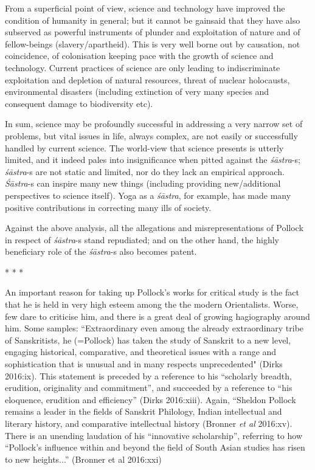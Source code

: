 From a superficial point of view, science and technology have improved the condition of humanity in general; but it cannot be gainsaid that they have also subserved as powerful instruments of plunder and exploitation of nature and of fellow-beings (slavery/apartheid). This is very well borne out by causation, not coincidence, of colonisation keeping pace with the growth of science and technology. Current practices of science are only leading to indiscriminate exploitation and depletion of natural resources, threat of nuclear holocausts, environmental disasters (including extinction of very many species and consequent damage to biodiversity etc).

In sum, science may be profoundly successful in addressing a very narrow set of problems, but vital issues in life, always complex, are not easily or successfully handled by current science. The world-view that science presents is utterly limited, and it indeed pales into insignificance when pitted against the \textit{śāstra}-s; \textit{śāstra}-s are not static and limited, nor do they lack an empirical approach. \textit{Śāstra}-s can inspire many new things (including providing new/additional perspectives to science itself). Yoga as a \textit{śāstra}, for example, has made many positive contributions in correcting many ills of society.

Against the above analysis, all the allegations and misrepresentations of Pollock in respect of \textit{śāstra}-s stand repudiated; and on the other hand, the highly beneficiary role of the \textit{śāstra}-s also becomes patent.

\begin{center}
* * *
\end{center}

\vskip -7pt

An important reason for taking up Pollock’s works for critical study is the fact that he is held in very high esteem among the the modern Orientalists. Worse, few dare to criticise him, and there is a great deal of growing hagiography around him. Some samples: “Extraordinary even among the already extraordinary tribe of Sanskritists, he (=Pollock) has taken the study of Sanskrit to a new level, engaging historical, comparative, and theoretical issues with a range and sophistication that is unusual and in many respects unprecedented" (Dirks 2016:ix). This statement is preceded by a reference to his “scholarly breadth, erudition, originality and commitment”, and succeeded by a reference to “his eloquence, erudition and efficiency” (Dirks 2016:xiii). Again, “Sheldon Pollock remains a leader in the fields of Sanskrit Philology, Indian intellectual and literary history, and comparative intellectual history (Bronner \textit{et al} 2016:xv). There is an unending laudation of his ``innovative scholarship'', referring to how ``Pollock’s influence within and beyond the field of South Asian studies has risen to new heights...”  (Bronner et al 2016:xxi)

